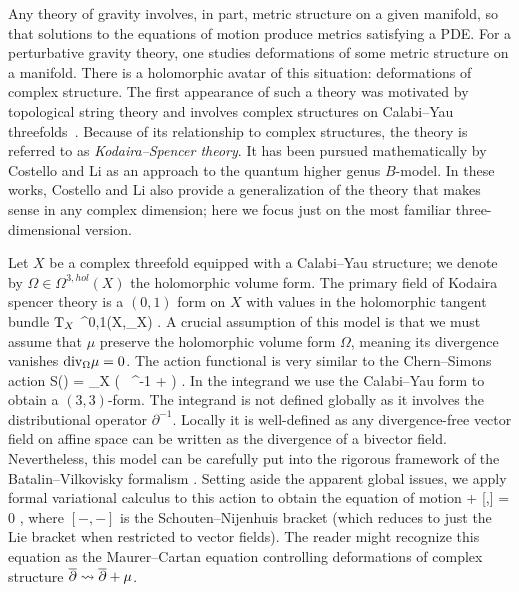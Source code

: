 \documentclass[11pt]{amsart}
\def\del{\partial}
\begin{document}
Any theory of gravity involves, in part, metric structure on a given manifold,
so that solutions to the equations of motion produce metrics satisfying a PDE. 
For a perturbative gravity theory,
one studies deformations of some metric structure on a manifold.
There is a holomorphic avatar of this situation: deformations of complex structure. 
The first appearance of such a theory was motivated by topological string theory and involves complex structures on Calabi--Yau threefolds~\cite{BCOV}.
Because of its relationship to complex structures, the theory is referred to as \textit{Kodaira--Spencer theory}.
It has been pursued mathematically by Costello and Li \cite{CLbcov1,CLbcov2,LiThesis} as an approach to the quantum higher genus $B$-model.
In these works, Costello and Li also provide a generalization of the theory that makes sense in any complex dimension; here we focus just on the most familiar three-dimensional version.

Let $X$ be a complex threefold equipped with a Calabi--Yau structure; we denote by $\Omega \in \Omega^{3,hol}(X)$ the holomorphic volume form.
The primary field of Kodaira spencer theory is a $(0,1)$ form on $X$ with values in the holomorphic tangent bundle ${\rm T}_X$
\beqn
\mu \in \Omega^{0,1}(X,\T_X) .
\eeqn 
A crucial assumption of this model is that we must assume that $\mu$ preserve the holomorphic volume form $\Omega$, meaning its divergence vanishes ${\rm div}_\Omega \mu = 0$.
The action functional is very similar to the Chern--Simons action
\beqn\label{eqn:KS1}
S(\mu) = \int_X \left( \mu\, \dbar \del^{-1} \mu +  \mu \wedge \mu \wedge \mu \right) .
\eeqn
In the integrand we use the Calabi--Yau form to obtain a $(3,3)$-form.
The integrand is not defined globally as it involves the distributional operator $\del^{-1}$.
Locally it is well-defined as any divergence-free vector field on affine space can be written as the divergence of a bivector field.
Nevertheless, this model can be carefully put into the rigorous framework of the Batalin--Vilkovisky formalism \cite{CLbcov1}.
Setting aside the apparent global issues, 
we apply formal variational calculus to this action to obtain the equation of motion
\beqn
\dbar \mu +  [\mu,\mu] = 0 ,
\eeqn
where $[-,-]$ is the Schouten--Nijenhuis bracket 
(which reduces to just the Lie bracket when restricted to vector fields).
The reader might recognize this equation as the Maurer--Cartan equation controlling deformations of complex structure ${\overline{\partial}}\rightsquigarrow {\overline{\partial}} + \mu$.
\end{document}
